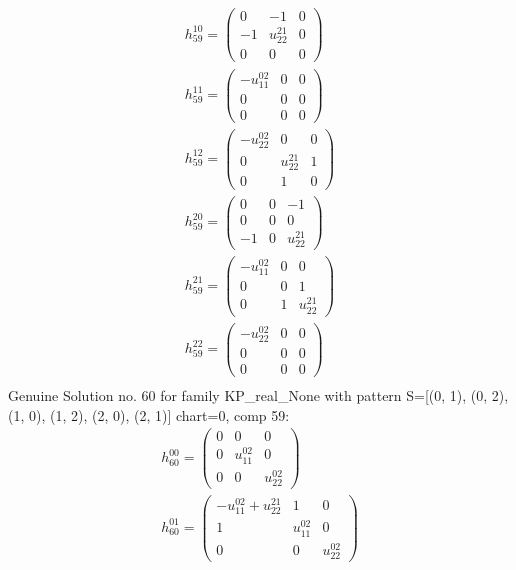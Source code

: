 \documentclass[a4paper, 11pt, twoside, onecolumn]{article}
\begin{document}
\begin{landscape}
\begin{gather*}
	 h_{59}^{10}=\begin{pmatrix}0 & -1 & 0\\-1 & u^{21}_{22} & 0\\0 & 0 & 0\end{pmatrix}\\ 
	 h_{59}^{11}=\begin{pmatrix}- u^{02}_{11} & 0 & 0\\0 & 0 & 0\\0 & 0 & 0\end{pmatrix}\\ 
	 h_{59}^{12}=\begin{pmatrix}- u^{02}_{22} & 0 & 0\\0 & u^{21}_{22} & 1\\0 & 1 & 0\end{pmatrix}\\ 
	 h_{59}^{20}=\begin{pmatrix}0 & 0 & -1\\0 & 0 & 0\\-1 & 0 & u^{21}_{22}\end{pmatrix}\\ 
	 h_{59}^{21}=\begin{pmatrix}- u^{02}_{11} & 0 & 0\\0 & 0 & 1\\0 & 1 & u^{21}_{22}\end{pmatrix}\\ 
	 h_{59}^{22}=\begin{pmatrix}- u^{02}_{22} & 0 & 0\\0 & 0 & 0\\0 & 0 & 0\end{pmatrix}\\ 
\end{gather*} 
Genuine Solution no. 60 for family KP_real_None with pattern S=[(0, 1), (0, 2), (1, 0), (1, 2), (2, 0), (2, 1)] chart=0, comp 59: 
\begin{gather*} 
	 h_{60}^{00}=\begin{pmatrix}0 & 0 & 0\\0 & u^{02}_{11} & 0\\0 & 0 & u^{02}_{22}\end{pmatrix}\\ 
	 h_{60}^{01}=\begin{pmatrix}- u^{02}_{11} + u^{21}_{22} & 1 & 0\\1 & u^{02}_{11} & 0\\0 & 0 & u^{02}_{22}\end{pmatrix}\\ 

\end{gather*}
\end{landscape}
\end{document}
